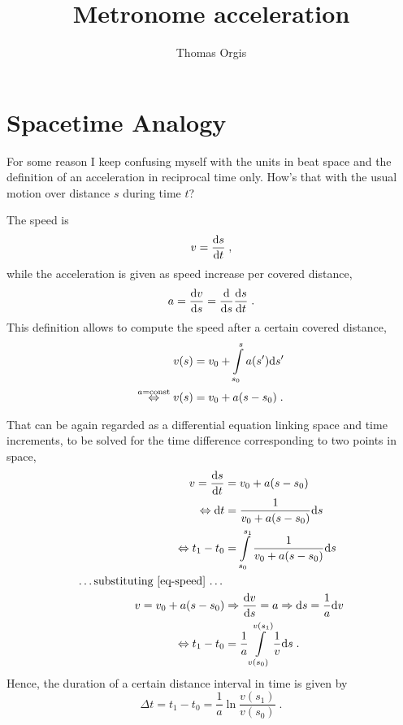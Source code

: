 \documentclass[12pt]{article}
\author{Thomas Orgis}
\title{Metronome acceleration}
\newcommand\de[0]{\text d}
\newcommand\dd[2]{\frac{\de #1}{\de #2}}
\newcommand\dnd[1]{\frac{\de}{\de #1}}
\begin{document}
\maketitle

\section*{Spacetime Analogy}

For some reason I keep confusing myself with the units in beat space and
the definition of an acceleration in reciprocal time only. How's that
with the usual motion over distance $s$ during time $t$?

The speed is
\begin{equation}
	v = \dd st
\;,
\end{equation}
while the acceleration is given as speed increase per covered distance,
\begin{equation}
	a = \dd vs = \dnd s \dd st
\;.
\end{equation}
This definition allows to compute the speed after a certain covered
distance,
\begin{equation}
\begin{aligned}
\label{eq-speed}
	v(s) &= v_0 + \int\limits_{s_0}^s a(s') \de s'
\\
\stackrel{a = \text{const}}{\Leftrightarrow}
	v(s) &= v_0 + a(s-s_0)
\;.
\end{aligned}
\end{equation}

That can be again regarded as a differential equation linking
space and time increments, to be solved for the time difference
corresponding to two points in space,
\begin{equation}
\begin{aligned}
	v =
	\dd st &= v_0 + a(s-s_0)
\\
\Leftrightarrow
	\de t &= \frac 1{v_0 + a(s-s_0)} \de s
\\
\Leftrightarrow
	t_1 - t_0 &=
	\int\limits_{s_0}^{s_1}  \frac 1{v_0 + a(s-s_0)} \de s
\\\text{\ldots substituting \autoref{eq-speed} \ldots}
\\
	v = v_0 + a(s-s_0)
	&\Rightarrow \dd vs = a
	\Rightarrow \de s = \frac 1a \de v
\\
\Leftrightarrow
        t_1 - t_0 &=                           
        \frac 1a \int\limits_{v(s_0)}^{v(s_1)}  \frac 1v \de s
\;.
\end{aligned}
\end{equation}
Hence, the duration of a certain distance interval in time is given by
\begin{equation}
\label{eq-deltat}
        \Delta t = t_1 - t_0
	= \frac 1a \ln \frac {v(s_1)}{v(s_0)}
\;.
\end{equation}
\end{document}
